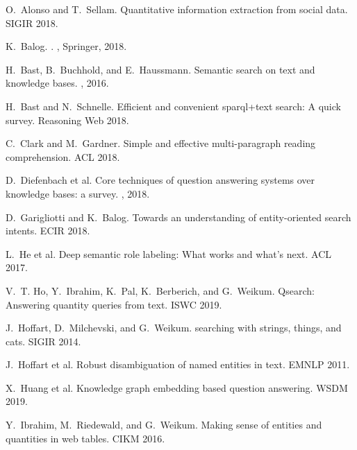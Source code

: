 \begin{thebibliography}{10}

O.~Alonso and T.~Sellam.
\newblock Quantitative information extraction from social data.
\newblock SIGIR 2018.

K.~Balog.
.
, Springer, 2018.

H.~Bast, B.~Buchhold, and E.~Haussmann.
\newblock Semantic search on text and knowledge bases.
, 2016.

H.~Bast and N.~Schnelle.
\newblock Efficient and convenient sparql+text search: {A} quick survey.
\newblock Reasoning Web 2018.

C.~Clark and M.~Gardner.
\newblock Simple and effective multi-paragraph reading comprehension.
\newblock ACL 2018.

D.~Diefenbach et al.
\newblock Core techniques of question answering systems over knowledge bases: a
  survey.
, 2018.

D.~Garigliotti and K.~Balog.
\newblock Towards an understanding of entity-oriented search intents.
\newblock ECIR 2018.

L.~He et al.
\newblock Deep semantic role labeling: What works and what's next.
\newblock ACL 2017.

V.~T. Ho, Y.~Ibrahim, K.~Pal, K.~Berberich, and G.~Weikum.
\newblock Qsearch: Answering quantity queries from text.
\newblock ISWC 2019.

J.~Hoffart, D.~Milchevski, and G.~Weikum.
 searching with strings, things, and cats.
\newblock SIGIR 2014.

J.~Hoffart et al.
\newblock Robust disambiguation of named entities in text.
\newblock EMNLP 2011.

X.~Huang et al.
\newblock Knowledge graph embedding based question answering.
\newblock WSDM 2019.

Y.~Ibrahim, M.~Riedewald, and G.~Weikum.
\newblock Making sense of entities and quantities in web tables.
\newblock CIKM 2016.


\end{thebibliography}

